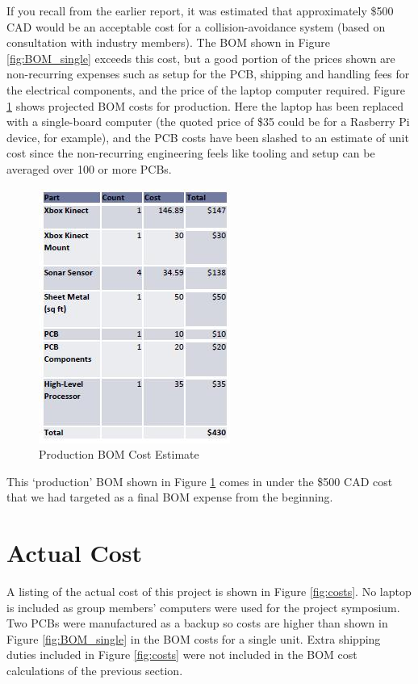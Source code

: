\documentclass[oneside,final,a4paper]{report}
\begin{document}
If you recall from the earlier report, it was estimated that approximately \$500 CAD would be an acceptable cost for a collision-avoidance system (based on consultation with industry members). The BOM shown in Figure \ref{fig:BOM_single} exceeds this cost, but a good portion of the prices shown are non-recurring expenses such as setup for the PCB, shipping and handling fees for the electrical components, and the price of the laptop computer required. Figure \ref{fig:BOM_prod} shows  projected BOM costs for production. Here the laptop has been replaced with a single-board computer (the quoted price of \$35 could be for a Rasberry Pi device, for example), and the PCB costs have been slashed to an estimate of unit cost since the non-recurring engineering feels like tooling and setup can be averaged over 100 or more PCBs.

\begin{figure}[hbt]
 \centering
 \includegraphics[scale=1]{BOM_production}
 \caption{Production BOM Cost Estimate}
 \label{fig:BOM_prod}
\end{figure}

This `production' BOM shown in Figure \ref{fig:BOM_prod} comes in under the \$500 CAD cost that we had targeted as a final BOM expense from the beginning.


\section{Actual Cost}

A listing of the actual cost of this project is shown in Figure \ref{fig:costs}. No laptop is included as group members' computers were used for the project symposium. Two PCBs were manufactured as a backup so costs are higher than shown in Figure \ref{fig:BOM_single} in the BOM costs for a single unit. Extra shipping duties included in Figure \ref{fig:costs} were not included in the BOM cost calculations of the previous section.
\end{document}
